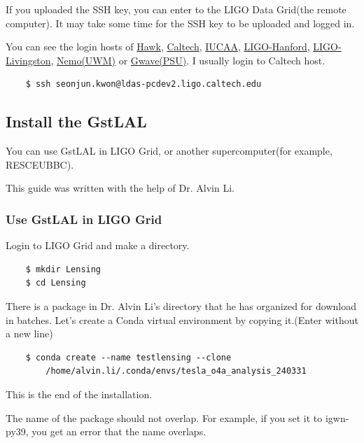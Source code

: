 If you uploaded the SSH key, you can enter to the LIGO Data Grid(the remote computer). It may take some time for the SSH key to be uploaded and logged in.

You can see the login hosts of \href{https://computing.docs.ligo.org/guide/computing-centres/hawk/}{Hawk}, \href{https://computing.docs.ligo.org/guide/computing-centres/cit/}{Caltech}, \href{https://computing.docs.ligo.org/guide/computing-centres/iucaa/}{IUCAA}, \href{https://computing.docs.ligo.org/guide/computing-centres/lho/}{LIGO-Hanford}, \href{https://computing.docs.ligo.org/guide/computing-centres/llo/}{LIGO-Livingston}, \href{https://computing.docs.ligo.org/guide/computing-centres/nemo/}{Nemo(UWM)} or \href{https://computing.docs.ligo.org/guide/computing-centres/psu/}{Gwave(PSU)}. I usually login to Caltech host.

\begin{verbatim}
    $ ssh seonjun.kwon@ldas-pcdev2.ligo.caltech.edu
\end{verbatim}

\subsection{Install the GstLAL}

You can use GstLAL in LIGO Grid, or another supercomputer(for example, RESCEUBBC).

This guide was written with the help of Dr. Alvin Li.

\subsubsection{Use GstLAL in LIGO Grid}

Login to LIGO Grid and make a directory.

\begin{verbatim}
    $ mkdir Lensing
    $ cd Lensing
\end{verbatim}

There is a package in Dr. Alvin Li's directory that he has organized for download in batches. Let's create a Conda virtual environment by copying it.(Enter without a new line)

\begin{verbatim}
    $ conda create --name testlensing --clone
        /home/alvin.li/.conda/envs/tesla_o4a_analysis_240331
\end{verbatim}

This is the end of the installation.

The name of the package should not overlap. For example, if you set it to igwn-py39, you get an error that the name overlaps.

